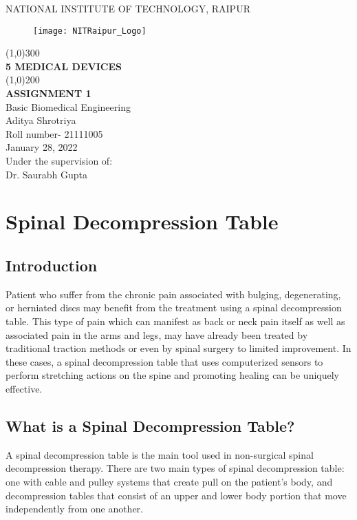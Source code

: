 \documentclass[12pt]{article}
\begin{document}
\begin{titlepage}
\begin{center}

\large{NATIONAL INSTITUTE OF TECHNOLOGY, RAIPUR}\\
[1.5mm]
\begin{figure}[h]
\centering
\texttt{[image: NITRaipur\_Logo]}
\end{figure}
\line(1,0){300}\\
[0.25in]
\huge{\bfseries 5 MEDICAL DEVICES}\\
[2mm]
\line(1,0){200}\\
[0.25in]
\large{\bfseries ASSIGNMENT 1}\\
{Basic Biomedical Engineering}\\
[0.75cm]
\large{Aditya Shrotriya}\\
{Roll number- 21111005}\\
{January 28, 2022}\\
[1cm]
\large{Under the supervision of:}\\
{Dr. Saurabh Gupta}

\end{center}
\end{titlepage}
\clearpage
\tableofcontents 
\clearpage

\section{Spinal Decompression Table}

\subsection{Introduction}
Patient who suffer from the chronic pain associated with bulging, degenerating, or herniated discs may benefit from the treatment using a spinal decompression table. This type of pain which can manifest as back or neck pain itself as well as associated pain in the arms and legs, may have already been treated by traditional traction methods or even by spinal surgery to limited improvement. In these cases, a spinal decompression table that uses computerized sensors to perform stretching actions on the spine and promoting healing can be uniquely effective.

\subsection{What is a Spinal Decompression Table?}
A spinal decompression table is the main tool used in non-surgical spinal decompression therapy. There are two main types of spinal decompression table: one with cable and pulley systems that create pull on the patient's body, and decompression tables that consist of an upper and lower body portion that move independently from one another. 
\end{document}
